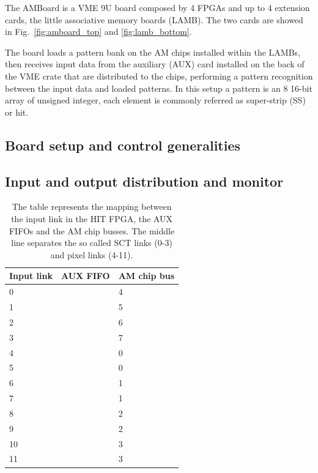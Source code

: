 The AMBoard is a VME 9U board composed by 4 FPGAs and up to 4 extension cards,
the little associative memory boards (LAMB). The two cards are showed in 
Fig.~\ref{fig:amboard_top} and \ref{fig:lamb_bottom}.

The board loads a pattern
bank on the AM chips installed within the LAMBs, then receives input data
from the auxiliary (AUX) card installed on the back of the VME crate that are
distributed to the chips, performing a pattern recognition between the 
input data and loaded patterns. In this setup a pattern is an 8 16-bit array
of unsigned integer, each element is commonly referred as super-strip (SS)
or hit. 

\subsection{Board setup and control generalities}

\subsection{Input and output distribution and monitor}

\begin{table}
	\centering
	\begin{tabular}{|l|l|l|}
	\hline
	\textbf{Input link} & \textbf{AUX FIFO}& \textbf{AM chip bus} \\
	\hline\hline
	0 & & 4 \\ 
	1 & & 5 \\ 
	2 & & 6 \\ 
	3 & & 7 \\
	\hline
	4 & & 0 \\
	5 & & 0 \\
	6 & & 1 \\
	7 & & 1 \\
	8 & & 2 \\
	9 & & 2 \\
	10 & & 3 \\
	11 & & 3 \\
	\hline
\end{tabular}

\caption{The table represents the mapping between the input link
	in the HIT FPGA, the AUX FIFOs and the AM chip busses. The middle line
	separates the so called SCT links (0-3) and pixel links (4-11).}
\label{tab:inputmap}
\end{table}

